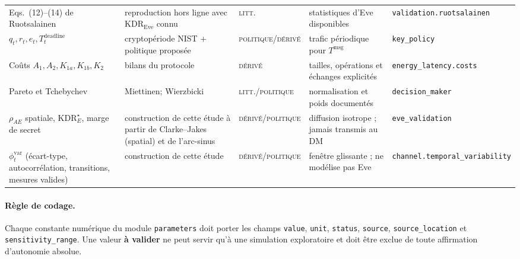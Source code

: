 \documentclass[conference,a4paper]{IEEEtran}
\newcommand{\statusLit}{\textsc{litt.}}
\newcommand{\statusDer}{\textsc{dérivé}}
\newcommand{\statusPol}{\textsc{politique}}
\newcommand{\statusVal}{\textcolor{red!70!black}{\textbf{à valider}}}
\newcommand{\KDR}{\mathrm{KDR}}
\begin{document}
\begin{table}[H]
\begin{tabularx}{\textwidth}{@{}l Y Y Y Y@{}}
Eqs.~(12)--(14) de Ruotsalainen & reproduction hors ligne avec $\KDR_{\mathrm{Eve}}$ connu & \statusLit{} & statistiques d'Eve disponibles & \texttt{validation.ruotsalainen} \\
$q_t,r_t,e_t,T_t^{\mathrm{deadline}}$ & cryptopériode NIST + politique proposée & \statusPol{}/\statusDer{} & trafic périodique pour $T^{\mathrm{msg}}$ & \texttt{key\_policy} \\
Coûts $A_1,A_2,K_{1a},K_{1b},K_2$ & bilans du protocole & \statusDer{} & tailles, opérations et échanges explicités & \texttt{energy\_latency.costs} \\
Pareto et Tchebychev & Miettinen; Wierzbicki & \statusLit{}/\statusPol{} & normalisation et poids documentés & \texttt{decision\_maker} \\
$\rho_{AE}$ spatiale, $\KDR_E^\star$, marge de secret & construction de cette étude à partir de Clarke--Jakes (spatial) et de l'arc-sinus & \statusDer{}/\statusPol{} & diffusion isotrope ; jamais transmis au DM & \texttt{eve\_validation} \\
$\phi_t^{\mathrm{var}}$ (écart-type, autocorrélation, transitions, mesures valides) & construction de cette étude & \statusDer{}/\statusPol{} & fenêtre glissante ; ne modélise pas Eve & \texttt{channel.temporal\_variability} \\
\bottomrule
\end{tabularx}
\end{table}

\paragraph{Règle de codage.}
Chaque constante numérique du module \texttt{parameters} doit porter les champs \texttt{value}, \texttt{unit}, \texttt{status}, \texttt{source}, \texttt{source\_location} et \texttt{sensitivity\_range}. Une valeur \statusVal{} ne peut servir qu'à une simulation exploratoire et doit être exclue de toute affirmation d'autonomie absolue.

\clearpage
\twocolumn
\balance
\end{document}
